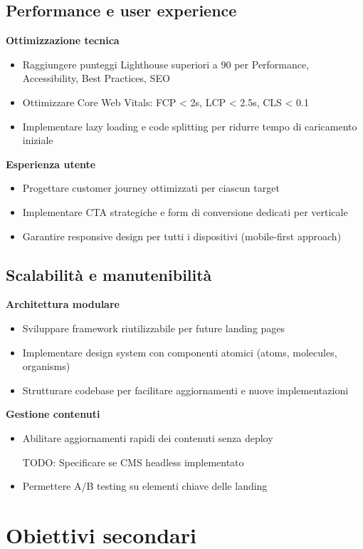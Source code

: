 \subsection{Performance e user experience}
\textbf{Ottimizzazione tecnica}
\begin{itemize}
  \item Raggiungere punteggi Lighthouse superiori a 90 per Performance, Accessibility, Best Practices, SEO
  \item Ottimizzare Core Web Vitals: FCP < 2s, LCP < 2.5s, CLS < 0.1
  \item Implementare lazy loading e code splitting per ridurre tempo di caricamento iniziale
\end{itemize}

\textbf{Esperienza utente}
\begin{itemize}
  \item Progettare customer journey ottimizzati per ciascun target
  \item Implementare CTA strategiche e form di conversione dedicati per verticale
  \item Garantire responsive design per tutti i dispositivi (mobile-first approach)
\end{itemize}

\subsection{Scalabilità e manutenibilità}
\textbf{Architettura modulare}
\begin{itemize}
  \item Sviluppare framework riutilizzabile per future landing pages
  \item Implementare design system con componenti atomici (atoms, molecules, organisms)
  \item Strutturare codebase per facilitare aggiornamenti e nuove implementazioni
\end{itemize}

\textbf{Gestione contenuti}
\begin{itemize}
  \item Abilitare aggiornamenti rapidi dei contenuti senza deploy
  \item [TODO: Specificare se CMS headless implementato]
  \item Permettere A/B testing su elementi chiave delle landing
\end{itemize}

\section{Obiettivi secondari}

